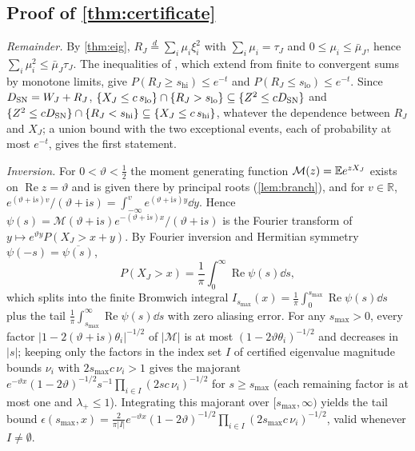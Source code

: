 \subsection{Proof of \texorpdfstring{\cref{thm:certificate}}{the certified enclosure}}
\emph{Remainder.} By \cref{thm:eig}, $R_J\overset d=\sum_i\mu_i\xi_i^2$ with $\sum_i\mu_i=\tau_J$ and
$0\le\mu_i\le\bar\mu_J$, hence $\sum_i\mu_i^2\le\bar\mu_J\tau_J$. The inequalities of \citet[Lemma~1]{LM00}, which extend
from finite to convergent sums by monotone limits, give $P(R_J\ge s_{\mathrm{hi}})\le e^{-t}$ and
$P(R_J\le s_{\mathrm{lo}})\le e^{-t}$. Since $D_{\mathrm{SN}}=W_J+R_J$, $\{X_J\le c\,s_{\mathrm{lo}}\}\cap\{R_J>s_{\mathrm{lo}}\}\subseteq\{Z^2\le cD_{\mathrm{SN}}\}$ and
$\{Z^2\le cD_{\mathrm{SN}}\}\cap\{R_J<s_{\mathrm{hi}}\}\subseteq\{X_J\le c\,s_{\mathrm{hi}}\}$, whatever the dependence between $R_J$ and
$X_J$; a union bound with the two exceptional events, each of probability at most $e^{-t}$, gives the first statement.

\emph{Inversion.} For $0<\vartheta<\frac12$ the moment generating function $\mathcal M(z)=\mathbb E e^{zX_J}$ exists on
$\operatorname{Re}z=\vartheta$ and is given there by principal roots (\cref{lem:branch}), and for $v\in\mathbb R$, $e^{(\vartheta+\mathrm is)v}/(\vartheta+\mathrm is)=\int_{-\infty}^ve^{(\vartheta+\mathrm is)y}\dd y$.
Hence $\psi(s)=\mathcal M(\vartheta+\mathrm is)e^{-(\vartheta+\mathrm is)x}/(\vartheta+\mathrm is)$ is the Fourier transform of
$y\mapsto e^{\vartheta y}P(X_J>x+y)$. By Fourier inversion and Hermitian symmetry $\psi(-s)=\overline{\psi(s)}$,
\[P(X_J>x)=\frac1\pi\int_0^\infty\operatorname{Re}\psi(s)\dd s,\]
which splits into the finite Bromwich integral $I_{s_{\max}}(x)=\frac1\pi\int_0^{s_{\max}}\operatorname{Re}\psi(s)\dd s$
plus the tail $\frac1\pi\int_{s_{\max}}^\infty\operatorname{Re}\psi(s)\dd s$ with zero aliasing error. For any
$s_{\max}>0$, every factor $|1-2(\vartheta+\mathrm is)\theta_i|^{-1/2}$ of $|\mathcal M|$ is at most
$(1-2\vartheta\theta_i)^{-1/2}$ and decreases in $|s|$; keeping only the factors in the index set $I$ of certified
eigenvalue magnitude bounds $\nu_i$ with $2s_{\max}c\,\nu_i>1$ gives the majorant
$e^{-\vartheta x}(1-2\vartheta)^{-1/2}s^{-1}\prod_{i\in I}(2sc\,\nu_i)^{-1/2}$ for $s\ge s_{\max}$ (each remaining
factor is at most one and $\lambda_+\le1$). Integrating this majorant over $[s_{\max},\infty)$ yields the tail bound
$\epsilon(s_{\max},x)=\frac{2}{\pi|I|}e^{-\vartheta x}(1-2\vartheta)^{-1/2}\prod_{i\in I}(2s_{\max}c\,\nu_i)^{-1/2}$,
valid whenever $I\ne\emptyset$.

